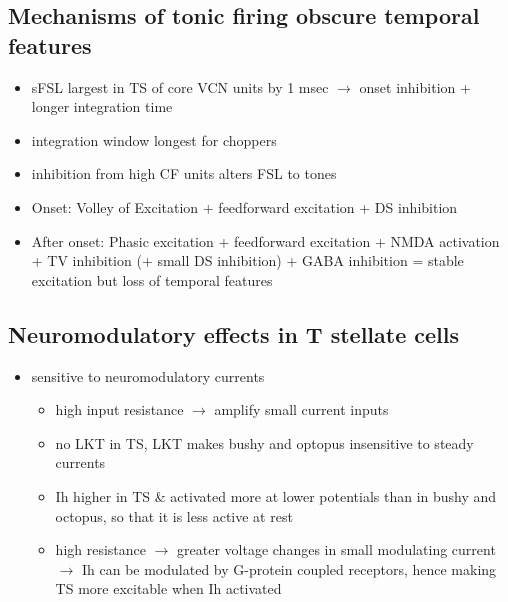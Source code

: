 \subsection{Mechanisms of tonic firing obscure temporal features}
\label{sec-1_4}



\begin{itemize}
\item sFSL largest in TS of core VCN units by 1 msec $\rightarrow$ onset inhibition + longer integration time \citep{GisbergenGrashuisEtAl:1975,GisbergenGrashuisEtAl:1975a,GisbergenGrashuisEtAl:1975b,YoungRobertEtAl:1988,PaoliniClareyEtAl:2004}
\item integration window longest for choppers \citep{McGinleyOertel:2006}
\item inhibition from high CF units alters FSL to tones \citep{Wickesberg:1996}
\item Onset: Volley of Excitation + feedforward excitation + DS inhibition
\item After onset: Phasic excitation + feedforward excitation + NMDA activation + TV inhibition (+ small DS inhibition) + GABA inhibition = stable excitation but loss of temporal features
\end{itemize}

\subsection{Neuromodulatory effects in T stellate cells}
\label{sec-1_5}



\begin{itemize}
\item sensitive to neuromodulatory currents \citep{FujinoOertel:2001}
\begin{itemize}
\item high input resistance $\rightarrow$ amplify small current inputs \citep{FujinoOertel:2001}
\item no LKT in TS,  LKT makes bushy and optopus insensitive to steady currents \citep{OertelFujino:2001,McGinleyOertel:2006}
\item Ih higher in TS \& activated more at lower potentials than in bushy and octopus, so that it is less active at rest
\item high resistance $\rightarrow$ greater voltage changes in small modulating current $\rightarrow$ Ih can be modulated by G-protein coupled receptors, hence making TS more excitable when Ih activated \citep{RodriguesOertel:2006}
\end{itemize}
\end{itemize}

